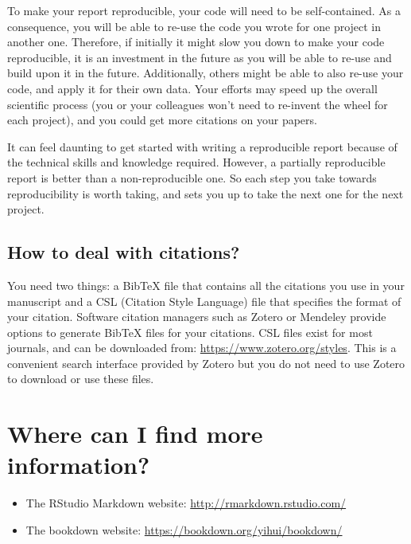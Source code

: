 \documentclass[
]{book}
\providecommand{\tightlist}{%
  \setlength{\itemsep}{0pt}\setlength{\parskip}{0pt}}
\theoremstyle{definition}
\theoremstyle{definition}
\theoremstyle{definition}
\theoremstyle{definition}
\theoremstyle{remark}
\begin{document}
To make your report reproducible, your code will need to be self-contained. As a consequence, you will be able to re-use the code you wrote for one project in another one. Therefore, if initially it might slow you down to make your code reproducible, it is an investment in the future as you will be able to re-use and build upon it in the future. Additionally, others might be able to also re-use your code, and apply it for their own data. Your efforts may speed up the overall scientific process (you or your colleagues won't need to re-invent the wheel for each project), and you could get more citations on your papers.

It can feel daunting to get started with writing a reproducible report because of the technical skills and knowledge required. However, a partially reproducible report is better than a non-reproducible one. So each step you take towards reproducibility is worth taking, and sets you up to take the next one for the next project.

\hypertarget{how-to-deal-with-citations}{%
\subsection{How to deal with citations?}\label{how-to-deal-with-citations}}

You need two things: a BibTeX file that contains all the citations you use in your manuscript and a CSL (Citation Style Language) file that specifies the format of your citation. Software citation managers such as Zotero or Mendeley provide options to generate BibTeX files for your citations. CSL files exist for most journals, and can be downloaded from: \url{https://www.zotero.org/styles}. This is a convenient search interface provided by Zotero but you do not need to use Zotero to download or use these files.

\hypertarget{where-can-i-find-more-information}{%
\section{Where can I find more information?}\label{where-can-i-find-more-information}}

\begin{itemize}
\tightlist
\item
  The RStudio Markdown website: \url{http://rmarkdown.rstudio.com/}
\item
  The bookdown website: \url{https://bookdown.org/yihui/bookdown/}
\end{itemize}
\end{document}
